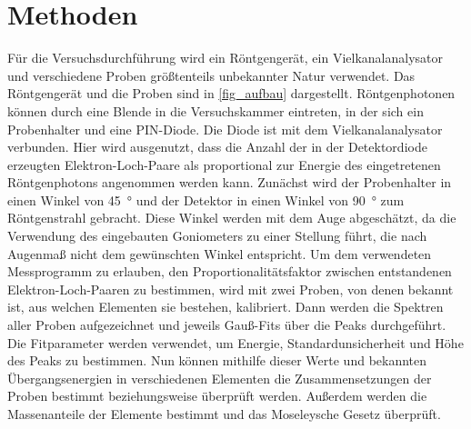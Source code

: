 \documentclass[
	a4paper,
	12pt,
	pagesize,
	ngerman
]{scrartcl}
\begin{document}
	\section{Methoden}
	Für die Versuchsdurchführung wird ein Röntgengerät, ein Vielkanalanalysator und verschiedene Proben größtenteils unbekannter Natur verwendet. %
	Das Röntgengerät und die Proben sind in \cref{fig_aufbau} dargestellt.
	Röntgenphotonen können durch eine Blende in die Versuchskammer eintreten, in der sich ein Probenhalter und eine PIN-Diode.
	Die Diode ist mit dem Vielkanalanalysator verbunden.
	Hier wird ausgenutzt, dass die Anzahl der in der Detektordiode erzeugten Elektron-Loch-Paare als proportional zur Energie des eingetretenen Röntgenphotons angenommen werden kann.
	Zunächst wird der Probenhalter in einen Winkel von \SI{45}{\degree} und der Detektor in einen Winkel von \SI{90}{\degree} zum Röntgenstrahl gebracht.
	Diese Winkel werden mit dem Auge abgeschätzt, da die Verwendung des eingebauten Goniometers zu einer Stellung führt, die nach Augenmaß nicht dem gewünschten Winkel entspricht.
	Um dem verwendeten Messprogramm zu erlauben, den Proportionalitätsfaktor zwischen entstandenen Elektron-Loch-Paaren zu bestimmen, wird mit zwei Proben, von denen bekannt ist, aus welchen Elementen sie bestehen, kalibriert. %
	Dann werden die Spektren aller Proben aufgezeichnet und jeweils Gauß-Fits über die Peaks durchgeführt.
	Die Fitparameter werden verwendet, um Energie, Standardunsicherheit und Höhe des Peaks zu bestimmen.
	Nun können mithilfe dieser Werte und bekannten Übergangsenergien in verschiedenen Elementen die Zusammensetzungen der Proben bestimmt beziehungsweise überprüft werden. %
	Außerdem werden die Massenanteile der Elemente bestimmt und das Moseleysche Gesetz überprüft.
	
\end{document}
